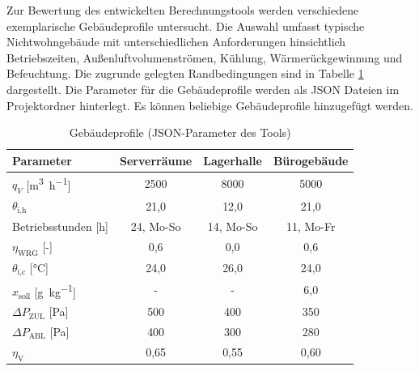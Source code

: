 \documentclass{scrreprt}
\begin{document}
Zur Bewertung des entwickelten Berechnungstools werden verschiedene exemplarische Gebäudeprofile untersucht. Die Auswahl umfasst typische Nichtwohngebäude mit unterschiedlichen Anforderungen hinsichtlich Betriebszeiten, Außenluftvolumenströmen, Kühlung, Wärmerückgewinnung und Befeuchtung. Die zugrunde gelegten Randbedingungen sind in Tabelle \ref{tab:ProfileServerraumLagerhalleGrossraumbuero} dargestellt. Die Parameter für die Gebäudeprofile werden als JSON Dateien im Projektordner hinterlegt. Es können beliebige Gebäudeprofile hinzugefügt werden.

\begin{table}[H]
    \centering
    \caption{Gebäudeprofile (JSON-Parameter des Tools)}
    \label{tab:ProfileServerraumLagerhalleGrossraumbuero}
    \begin{tabular}{lccc}
        \toprule
        Parameter & Serverräume & Lagerhalle & Bürogebäude \\
        \midrule
        $q_V$ [\si{\cubic\metre\per\hour}]& \num{2500} & \num{8000} & \num{5000} \\
        $\theta_{\text{i,h}}$ & 21,0 & 12,0 & 21,0 \\
        Betriebsstunden [h] & \num{24}, Mo-So & \num{14}, Mo-So & \num{11}, Mo-Fr \\
        $\eta_{\text{WRG}}$ [-]& 0,6 & 0,0 & 0,6 \\
        $\theta_{\text{i,c}}$ [\si{\celsius}]& 24,0 & 26,0 & 24,0 \\
        $x_{\text{soll}}$ [\si{\gram\per\kilo\gram}]& - & - & 6,0 \\
        $\Delta P_{\text{ZUL}}$ [\si{\pascal}] & \num{500} & \num{400} & \num{350} \\
        $\Delta P_{\text{ABL}}$ [\si{\pascal}]& \num{400} & \num{300} & \num{280} \\
        $\eta_{\text{V}}$ & 0,65 & 0,55 & 0,60 \\
        \bottomrule
    \end{tabular}
\end{table}

\end{document}
